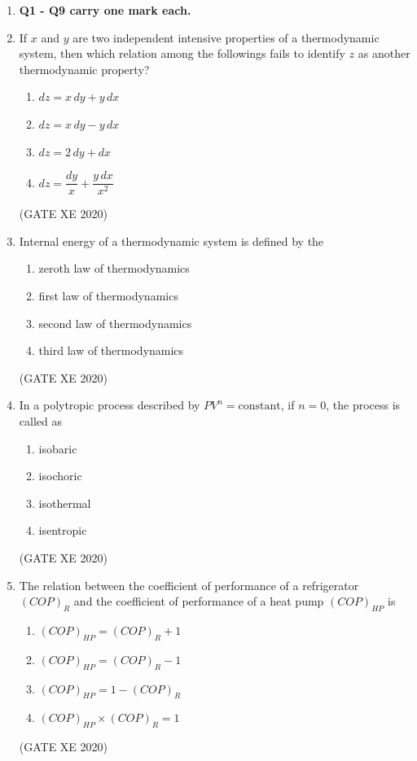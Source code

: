 \documentclass[12pt]{article}
\begin{document}
\begin{enumerate}

\item[] \textbf{Q1 - Q9 carry one mark each.}
\item If $x$ and $y$ are two independent intensive properties of a thermodynamic system, then which relation among the followings fails to identify $z$ as another thermodynamic property?

\begin{enumerate}
\item $dz = x \, dy + y \, dx$
\item $dz = x \, dy - y \, dx$
\item $dz = 2 \, dy + dx$
\item $dz = \dfrac{dy}{x} + \dfrac{y \, dx}{x^2}$
\end{enumerate}
(GATE XE 2020)

\item Internal energy of a thermodynamic system is defined by the
\begin{enumerate}
\item zeroth law of thermodynamics
\item first law of thermodynamics
\item second law of thermodynamics
\item third law of thermodynamics
\end{enumerate}
(GATE XE 2020)

\item In a polytropic process described by $PV^n = \text{constant}$, if $n=0$, the process is called as
\begin{enumerate}
\item isobaric
\item isochoric
\item isothermal
\item isentropic
\end{enumerate}
(GATE XE 2020)

\item The relation between the coefficient of performance of a refrigerator $(COP)_R$ and the coefficient of performance of a heat pump $(COP)_{HP}$ is
\begin{enumerate}
\item $(COP)_{HP} = (COP)_R + 1$
\item $(COP)_{HP} = (COP)_R - 1$
\item $(COP)_{HP} = 1 - (COP)_R$
\item $(COP)_{HP} \times (COP)_R = 1$
\end{enumerate}
(GATE XE 2020)


\end{enumerate}
\end{document}
